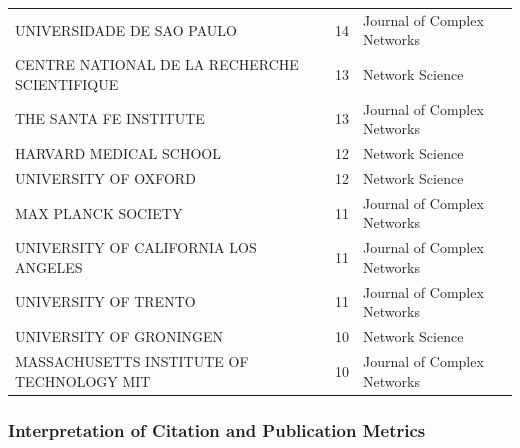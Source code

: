 \documentclass[twocolumn]{article}
\begin{document}
\begin{table}[htbp]
{\begin{tabular}{lcl}
				UNIVERSIDADE DE SAO PAULO                     & 14 & Journal of Complex Networks \\
				CENTRE NATIONAL DE LA RECHERCHE SCIENTIFIQUE  & 13 & Network Science \\
				THE SANTA FE INSTITUTE                        & 13 & Journal of Complex Networks \\
				HARVARD MEDICAL SCHOOL                        & 12 & Network Science \\
				UNIVERSITY OF OXFORD                          & 12 & Network Science \\
				MAX PLANCK SOCIETY                            & 11 & Journal of Complex Networks \\
				UNIVERSITY OF CALIFORNIA LOS ANGELES          & 11 & Journal of Complex Networks \\
				UNIVERSITY OF TRENTO                          & 11 & Journal of Complex Networks \\
				UNIVERSITY OF GRONINGEN                       & 10 & Network Science \\
				MASSACHUSETTS INSTITUTE OF TECHNOLOGY MIT     & 10 & Journal of Complex Networks \\
				\bottomrule
		\end{tabular}}
	\end{table}

	\subsubsection*{Interpretation of Citation and Publication Metrics}
	
\end{document}
